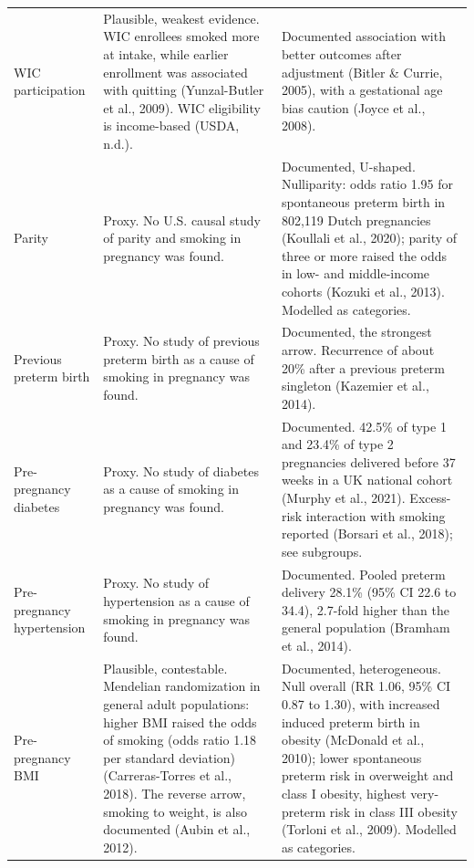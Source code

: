 \documentclass[11pt,letterpaper]{article}
\begin{document}
{\begin{longtable}{>{\raggedright\arraybackslash}p{}>{\raggedright\arraybackslash}p{}>{\raggedright\arraybackslash}p{}}
WIC participation & Plausible, weakest evidence. WIC enrollees smoked more at intake, while earlier enrollment was associated with quitting (Yunzal-Butler et al., 2009). WIC eligibility is income-based (USDA, n.d.). & Documented association with better outcomes after adjustment (Bitler \& Currie, 2005), with a gestational age bias caution (Joyce et al., 2008). \\
Parity & Proxy. No U.S. causal study of parity and smoking in pregnancy was found. & Documented, U-shaped. Nulliparity: odds ratio 1.95 for spontaneous preterm birth in 802,119 Dutch pregnancies (Koullali et al., 2020); parity of three or more raised the odds in low- and middle-income cohorts (Kozuki et al., 2013). Modelled as categories. \\
Previous preterm birth & Proxy. No study of previous preterm birth as a cause of smoking in pregnancy was found. & Documented, the strongest arrow. Recurrence of about 20\% after a previous preterm singleton (Kazemier et al., 2014). \\
Pre-pregnancy diabetes & Proxy. No study of diabetes as a cause of smoking in pregnancy was found. & Documented. 42.5\% of type 1 and 23.4\% of type 2 pregnancies delivered before 37 weeks in a UK national cohort (Murphy et al., 2021). Excess-risk interaction with smoking reported (Borsari et al., 2018); see subgroups. \\
Pre-pregnancy hypertension & Proxy. No study of hypertension as a cause of smoking in pregnancy was found. & Documented. Pooled preterm delivery 28.1\% (95\% CI 22.6 to 34.4), 2.7-fold higher than the general population (Bramham et al., 2014). \\
Pre-pregnancy BMI & Plausible, contestable. Mendelian randomization in general adult populations: higher BMI raised the odds of smoking (odds ratio 1.18 per standard deviation) (Carreras-Torres et al., 2018). The reverse arrow, smoking to weight, is also documented (Aubin et al., 2012). & Documented, heterogeneous. Null overall (RR 1.06, 95\% CI 0.87 to 1.30), with increased induced preterm birth in obesity (McDonald et al., 2010); lower spontaneous preterm risk in overweight and class I obesity, highest very-preterm risk in class III obesity (Torloni et al., 2009). Modelled as categories. \\
\end{longtable}
}
\end{document}
